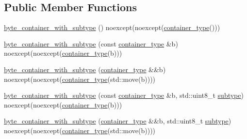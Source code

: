 \subsection*{Public Member Functions}
\begin{DoxyCompactItemize}
\item 
\hyperlink{classnlohmann_1_1byte__container__with__subtype_a89c78caf8c7b54dc1bcfa4b0b23d2fc8}{byte\+\_\+container\+\_\+with\+\_\+subtype} () noexcept(noexcept(\hyperlink{classnlohmann_1_1byte__container__with__subtype_a4d27e8633c5a5e3b49dd4ccb06515713}{container\+\_\+type}()))
\item 
\hyperlink{classnlohmann_1_1byte__container__with__subtype_a640b6dd55847e86dbb936f97b946170e}{byte\+\_\+container\+\_\+with\+\_\+subtype} (const \hyperlink{classnlohmann_1_1byte__container__with__subtype_a4d27e8633c5a5e3b49dd4ccb06515713}{container\+\_\+type} \&b) noexcept(noexcept(\hyperlink{classnlohmann_1_1byte__container__with__subtype_a4d27e8633c5a5e3b49dd4ccb06515713}{container\+\_\+type}(b)))
\item 
\hyperlink{classnlohmann_1_1byte__container__with__subtype_a73dcae1798eab1b496936bfae7b4b9c0}{byte\+\_\+container\+\_\+with\+\_\+subtype} (\hyperlink{classnlohmann_1_1byte__container__with__subtype_a4d27e8633c5a5e3b49dd4ccb06515713}{container\+\_\+type} \&\&b) noexcept(noexcept(\hyperlink{classnlohmann_1_1byte__container__with__subtype_a4d27e8633c5a5e3b49dd4ccb06515713}{container\+\_\+type}(std\+::move(b))))
\item 
\hyperlink{classnlohmann_1_1byte__container__with__subtype_ac267e4fe960124976452bb46d7fe6792}{byte\+\_\+container\+\_\+with\+\_\+subtype} (const \hyperlink{classnlohmann_1_1byte__container__with__subtype_a4d27e8633c5a5e3b49dd4ccb06515713}{container\+\_\+type} \&b, std\+::uint8\+\_\+t \hyperlink{classnlohmann_1_1byte__container__with__subtype_ac3ca9d09e55342f9588404e1dc2222f0}{subtype}) noexcept(noexcept(\hyperlink{classnlohmann_1_1byte__container__with__subtype_a4d27e8633c5a5e3b49dd4ccb06515713}{container\+\_\+type}(b)))
\item 
\hyperlink{classnlohmann_1_1byte__container__with__subtype_a7e3da6b709fc1ee661d298e74a29c06b}{byte\+\_\+container\+\_\+with\+\_\+subtype} (\hyperlink{classnlohmann_1_1byte__container__with__subtype_a4d27e8633c5a5e3b49dd4ccb06515713}{container\+\_\+type} \&\&b, std\+::uint8\+\_\+t \hyperlink{classnlohmann_1_1byte__container__with__subtype_ac3ca9d09e55342f9588404e1dc2222f0}{subtype}) noexcept(noexcept(\hyperlink{classnlohmann_1_1byte__container__with__subtype_a4d27e8633c5a5e3b49dd4ccb06515713}{container\+\_\+type}(std\+::move(b))))

\end{DoxyCompactItemize}
